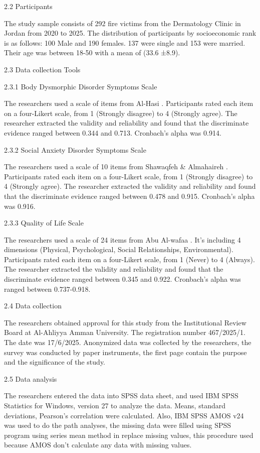 \documentclass[10pt]{NSP1}
\begin{document}
2.2 Participants

The study sample consists of 292 fire victims from the Dermatology Clinic in Jordan from 2020 to 2025. The distribution of participants by socioeconomic rank is as follows: 100 Male and 190 females. 137 were single and 153 were married. Their age was between 18-50 with a mean of (33.6 ±8.9).

2.3 Data collection Tools

2.3.1 Body Dysmorphic Disorder Symptoms Scale

The researchers used a scale of  items from Al-Hasi . Participants rated each item on a four-Likert scale, from 1 (Strongly disagree) to 4 (Strongly agree). The researcher extracted the validity and reliability and found that the discriminate evidence ranged between 0.344 and 0.713. Cronbach’s alpha was 0.914.

2.3.2 Social Anxiety Disorder Symptoms Scale

The researchers used a scale of 10 items from Shawaqfeh \& Almahaireh . Participants rated each item on a four-Likert scale, from 1 (Strongly disagree) to 4 (Strongly agree). The researcher extracted the validity and reliability and found that the discriminate evidence ranged between 0.478 and 0.915. Cronbach’s alpha was 0.916.

2.3.3 Quality of Life Scale

The researchers used a scale of 24 items from Abu Al-wafaa . It’s including 4 dimensions (Physical, Psychological, Social Relationships, Environmental). Participants rated each item on a four-Likert scale, from 1 (Never) to 4 (Always). The researcher extracted the validity and reliability and found that the discriminate evidence ranged between 0.345 and 0.922. Cronbach’s alpha was ranged between 0.737-0.918.

2.4 Data collection

The researchers obtained approval for this study from the Institutional Review Board at Al-Ahliyya Amman University. The registration number 467/2025/1. The date was 17/6/2025. Anonymized data was collected by the researchers, the survey was conducted by paper instruments, the first page contain the purpose and the significance of the study.

2.5 Data analysis

The researchers entered the data into SPSS data sheet, and used IBM SPSS Statistics for Windows, version 27 to analyze the data. Means, standard deviations, Pearson’s correlation were calculated. Also, IBM SPSS AMOS v24 was used to do the path analyses, the missing data were filled using SPSS program using series mean method in replace missing values, this procedure used because AMOS don’t calculate any data with missing values.
\end{document}
